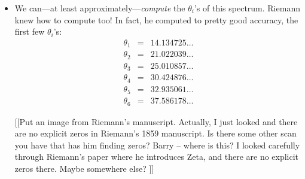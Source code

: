 \documentclass[11pt]{article}
\newcommand{\ill}[3]{ 
   \begin{figure}[htbp]
   \begin{center}
   \texttt{[image: illustrations/\#1]}
   \caption{#3}
   \end{center}
    \end{figure}
}
\theoremstyle{plain}
\theoremstyle{definition}
\numberwithin{equation}{section}
\numberwithin{figure}{section}
\numberwithin{table}{section}
\begin{document}
\begin{itemize}
{\ill{psi_approx_using_30_zeros_from4to5}{0.7}{Fourier 
approximation to the step function $\Psi$ obtained using $30$
frequences and graphed from $1$ to $5$}

\ill{psi_using_30_terms}{0.7}{Fourier approximation to the step 
function $\Psi$ obtained using $30$ frequences.}
}

\begin{figure}[htbp]
\begin{center}
\texttt{[image: illustrations/phi\_even]}
\caption{Approximation of (even) Fourier transform of $\Phi(t)$ using prime powers $<100$\label{fig:phi_even_a}}
\end{center}
\end{figure}


\item

 We can---at least approximately---{\it compute} the $\theta_i$'s of this spectrum. Riemann knew how to compute too!  In fact, he computed to pretty good accuracy, the first few $\theta_i$'s:
\begin{eqnarray*}
\theta_1 &=& 14.134725 \dots\\
\theta_2 &=& 21.022039 \dots\\
\theta_3 &=& 25.010857 \dots\\
\theta_4 &=& 30.424876 \dots\\
\theta_5 &=& 32.935061 \dots\\
\theta_6 &=& 37.586178 \dots
\end{eqnarray*}

[[Put an image from Riemann's manuscript.  Actually, I just looked
and there are no explicit zeros in Riemann's 1859 manuscript.  Is
there some other scan you have that has him finding zeros?
Barry -- where is this?  I looked carefully
through Riemann's paper where he introduces Zeta, and there are no
explicit zeros there.  Maybe somewhere else?
]]


\end{itemize}
\end{document}

